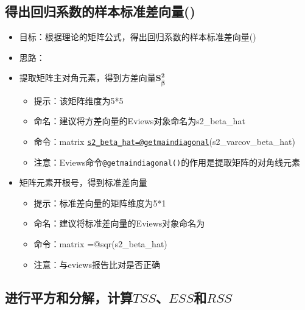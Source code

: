 \documentclass[12pt,(landscape,a4paper),(portrait,a4paper)]{article}
\providecommand{\tightlist}{%
  \setlength{\itemsep}{0pt}\setlength{\parskip}{0pt}}
\begin{document}
\subsection{得出回归系数的样本标准差向量()}

\begin{itemize}
\item
  目标：根据理论的矩阵公式，得出回归系数的样本标准差向量()
\item
  思路：
\item
  提取矩阵主对角元素，得到方差向量\(\mathbf{S_{\hat{\beta}}^2}\)

  \begin{itemize}
  \tightlist
  \item
    提示：该矩阵维度为5*5
  \item
    命名：建议将方差向量的Eviews对象命名为s2\_beta\_hat
  \item
    命令：matrix
    \href{mailto:s2_beta_hat=@getmaindiagonal}{\nolinkurl{s2\_beta\_hat=@getmaindiagonal}}(s2\_varcov\_beta\_hat)
  \item
    注意：Eviews命令\texttt{@getmaindiagonal()}的作用是提取矩阵的对角线元素
  \end{itemize}
\item
  矩阵元素开根号，得到标准差向量

  \begin{itemize}
  \tightlist
  \item
    提示：标准差向量的矩阵维度为5*1
  \item
    命名：建议将标准差向量的Eviews对象命名为
  \item
    命令：matrix =@sqr(s2\_beta\_hat)
  \item
    注意：与eviews报告比对是否正确
  \end{itemize}
\end{itemize}

\hypertarget{tssessrss}{%
\subsection{\texorpdfstring{进行平方和分解，计算\(TSS\)、\(ESS\)和\(RSS\)}{进行平方和分解，计算TSS、ESS和RSS}}\label{tssessrss}}
\end{document}
